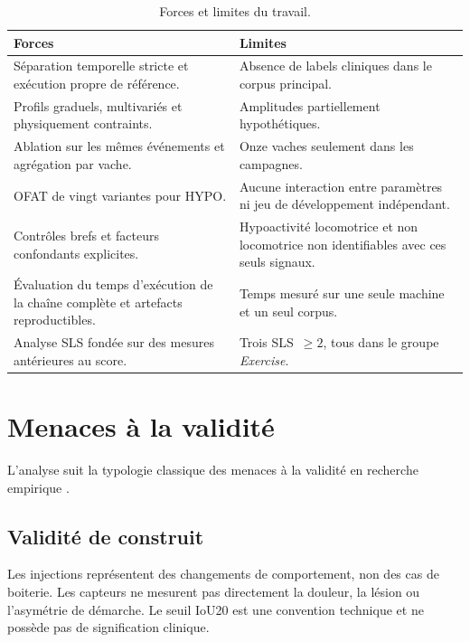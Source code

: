 \begin{table}[H]
  \centering
  \caption{Forces et limites du travail.}
  \label{tab:forces_limites}
  \small
  \begin{tabular}{p{}p{}}
    \toprule
    Forces & Limites \\
    \midrule
    Séparation temporelle stricte et exécution propre de référence.
      & Absence de labels cliniques dans le corpus principal. \\
    Profils graduels, multivariés et physiquement contraints.
      & Amplitudes partiellement hypothétiques. \\
    Ablation sur les mêmes événements et agrégation par vache.
      & Onze vaches seulement dans les campagnes. \\
    OFAT de vingt variantes pour HYPO.
      & Aucune interaction entre paramètres ni jeu de développement indépendant. \\
    Contrôles brefs et facteurs confondants explicites.
      & Hypoactivité locomotrice et non locomotrice non identifiables avec ces seuls signaux. \\
    Évaluation du temps d'exécution de la chaîne complète et artefacts reproductibles.
      & Temps mesuré sur une seule machine et un seul corpus. \\
    Analyse SLS fondée sur des mesures antérieures au score.
      & Trois SLS~$\geq2$, tous dans le groupe \textit{Exercise}. \\
    \bottomrule
  \end{tabular}
\end{table}

\section{Menaces à la validité}

L'analyse suit la typologie classique des menaces à la validité en recherche empirique
\citep{shadish2002experimental,wohlin2012experimentation}.

\subsection{Validité de construit}
Les injections représentent des changements de comportement, non des cas de boiterie. Les
capteurs ne mesurent pas directement la douleur, la lésion ou l'asymétrie de démarche. Le
seuil IoU20 est une convention technique et ne possède pas de signification clinique.

